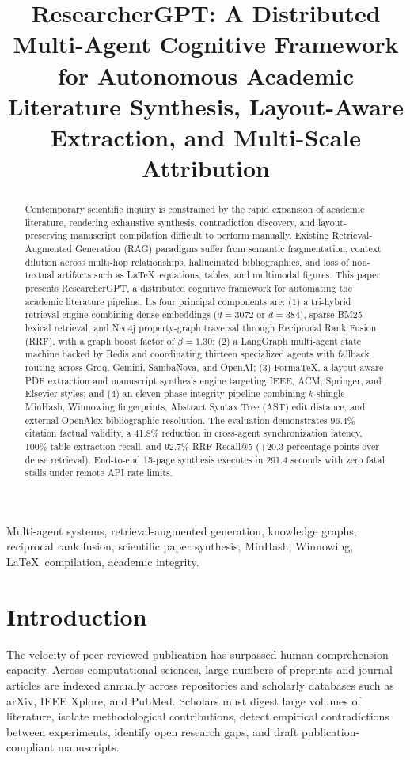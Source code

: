 \documentclass[conference]{IEEEtran}
\title{ResearcherGPT: A Distributed Multi-Agent Cognitive Framework for Autonomous Academic Literature Synthesis, Layout-Aware Extraction, and Multi-Scale Attribution}
\author{
\IEEEauthorblockN{Archit Gupta}
\IEEEauthorblockA{\textit{Department of Artificial Intelligence and Data Science}\\
\textit{Email: architag1503@gmail.com}}
\and
\IEEEauthorblockN{Tanishq Sharma}
\IEEEauthorblockA{\textit{Department of Artificial Intelligence and Data Science}\\
\textit{Email: tanishq2228@gmail.com}}
}
\begin{document}
\maketitle

\begin{abstract}
Contemporary scientific inquiry is constrained by the rapid expansion of academic literature, rendering exhaustive synthesis, contradiction discovery, and layout-preserving manuscript compilation difficult to perform manually. Existing Retrieval-Augmented Generation (RAG) paradigms suffer from semantic fragmentation, context dilution across multi-hop relationships, hallucinated bibliographies, and loss of non-textual artifacts such as \LaTeX\ equations, tables, and multimodal figures. This paper presents ResearcherGPT, a distributed cognitive framework for automating the academic literature pipeline. Its four principal components are: (1) a tri-hybrid retrieval engine combining dense embeddings ($d=3072$ or $d=384$), sparse BM25 lexical retrieval, and Neo4j property-graph traversal through Reciprocal Rank Fusion (RRF), with a graph boost factor of $\beta=1.30$; (2) a LangGraph multi-agent state machine backed by Redis and coordinating thirteen specialized agents with fallback routing across Groq, Gemini, SambaNova, and OpenAI; (3) FormaTeX, a layout-aware PDF extraction and manuscript synthesis engine targeting IEEE, ACM, Springer, and Elsevier styles; and (4) an eleven-phase integrity pipeline combining $k$-shingle MinHash, Winnowing fingerprints, Abstract Syntax Tree (AST) edit distance, and external OpenAlex bibliographic resolution. The evaluation demonstrates 96.4\% citation factual validity, a 41.8\% reduction in cross-agent synchronization latency, 100\% table extraction recall, and 92.7\% RRF Recall@5 (+20.3 percentage points over dense retrieval). End-to-end 15-page synthesis executes in 291.4 seconds with zero fatal stalls under remote API rate limits.
\end{abstract}

\begin{IEEEkeywords}
Multi-agent systems, retrieval-augmented generation, knowledge graphs, reciprocal rank fusion, scientific paper synthesis, MinHash, Winnowing, \LaTeX\ compilation, academic integrity.
\end{IEEEkeywords}

\section{Introduction}
The velocity of peer-reviewed publication has surpassed human comprehension capacity. Across computational sciences, large numbers of preprints and journal articles are indexed annually across repositories and scholarly databases such as arXiv, IEEE Xplore, and PubMed. Scholars must digest large volumes of literature, isolate methodological contributions, detect empirical contradictions between experiments, identify open research gaps, and draft publication-compliant manuscripts.
\end{document}
